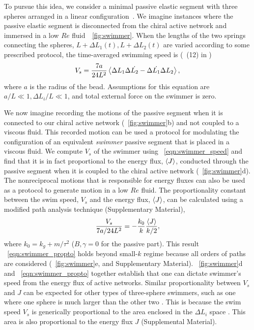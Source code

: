 \documentclass[
 preprint,
 preprintnumbers,
 amsmath,amssymb,
 aps,
 pre,
 longbibliography,
 superscriptaddress,
 10pt, twocolumn
]{revtex4-1}
\begin{document}
To pursue this idea, we consider a minimal passive elastic segment with three spheres arranged in a linear configuration~\cite{Golestanian2008AnalyticResults}. We imagine instances where the passive elastic segment is disconnected from the chiral active network and immersed in a low $Re$ fluid~\figurename~\ref{fig:swimmer}. When the lengths of the two springs connecting the spheres, $L+\Delta L_1(t), L+\Delta L_2(t)$ are varied according to some prescribed protocol, the time-averaged swimming speed is (\eqnname~(12) in \cite{Golestanian2008AnalyticResults})
\begin{equation} \label{eqn:swimmer_speed}
    V_s = \frac{7a}{24L^2} \expval{\Delta L_1 \Delta \Dot{L_2} - \Delta \Dot{L_1} \Delta{L_2}},
\end{equation}
where $a$ is the radius of the bead. Assumptions for this equation are $a/L \ll 1, \Delta L_i/L \ll 1$, and total external force on the swimmer is zero.

We now imagine recording the motions of the passive segment when it is connected to our chiral active network (\figurename~\ref{fig:swimmer}b) and not coupled to a viscous fluid. This recorded motion can be used a protocol for modulating the configuration of an equivalent {\it swimmer} passive segment that is placed in a viscous fluid.
We compute $V_s$ of the swimmer using \eqnname~\ref{eqn:swimmer_speed} and find that it is in fact proportional to the energy flux, $\expval{J}$, conducted through the passive segment when it is coupled to the chiral active network (\figurename~\ref{fig:swimmer}d). The nonreciprocal motions that is responsible for energy fluxes can also be used as a protocol to generate motion in a low $Re$ fluid.
The proportionality constant between the swim speed, $V_s$ and the energy flux, $\expval{J}$, can be calculated using a modified path analysis technique (Supplementary Material),
\begin{equation} \label{eqn:swimmer_propto}
    \frac{V_s}{7a/24L^2} = -\frac{k_0}{k} \frac{\expval{J}}{k/2},
\end{equation}
where $k_0 = k_g + m/\tau^2$ ($B,\gamma=0$ for the passive part).
This result \eqnname~\eqref{eqn:swimmer_propto} holds beyond small-$k$ regime because all orders of paths are considered (\figurename~\ref{fig:swimmer}e, and Supplementary Material).
\figurename~\ref{fig:swimmer}d and \eqnname~\eqref{eqn:swimmer_propto} together establish that one can dictate swimmer's speed from the energy flux of active networks.
Similar proportionality between $V_s$ and $J$ can be expected for other types of three-sphere swimmers, such as one where one sphere is much larger than the other two \cite{Golestanian2008ThreesphereLowReynoldsnumber}. This is because the swim speed $V_s$ is generically proportional to the area enclosed in the $\Delta L_i$ space \cite{Golestanian2009StochasticLow}. This area is also proportional to the energy flux $J$ (Supplemental Material).
\end{document}
